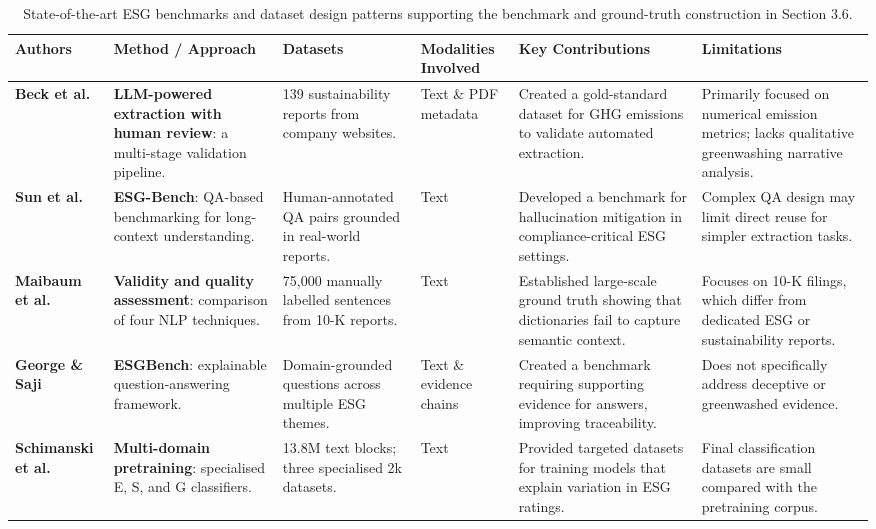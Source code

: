 \begin{landscape}
\begin{table}[p]
\centering
\caption{State-of-the-art ESG benchmarks and dataset design patterns supporting the benchmark and ground-truth construction in Section 3.6.}
\label{tab:esg-benchmark-dataset-design}
\small
\renewcommand{\arraystretch}{1.2}
\begin{tabularx}{\linewidth}{|p{1.8cm}|X|X|p{1.8cm}|X|X|}
\hline
Authors & Method / Approach & Datasets & Modalities Involved & Key Contributions & Limitations \\ \hline
\textbf{Beck et al.} \parencite{jacob_beck_9548a833} & \textbf{LLM-powered extraction with human review}: a multi-stage validation pipeline. & 139 sustainability reports from company websites. & Text \& PDF metadata & Created a gold-standard dataset for GHG emissions to validate automated extraction. & Primarily focused on numerical emission metrics; lacks qualitative greenwashing narrative analysis. \\ \hline
\textbf{Sun et al.} \parencite{siqi_sun_f6a51152} & \textbf{ESG-Bench}: QA-based benchmarking for long-context understanding. & Human-annotated QA pairs grounded in real-world reports. & Text & Developed a benchmark for hallucination mitigation in compliance-critical ESG settings. & Complex QA design may limit direct reuse for simpler extraction tasks. \\ \hline
\textbf{Maibaum et al.} \parencite{frederik_maibaum_b8629037} & \textbf{Validity and quality assessment}: comparison of four NLP techniques. & 75,000 manually labelled sentences from 10-K reports. & Text & Established large-scale ground truth showing that dictionaries fail to capture semantic context. & Focuses on 10-K filings, which differ from dedicated ESG or sustainability reports. \\ \hline
\textbf{George \& Saji} \parencite{s_s__george_b30d4b3e} & \textbf{ESGBench}: explainable question-answering framework. & Domain-grounded questions across multiple ESG themes. & Text \& evidence chains & Created a benchmark requiring supporting evidence for answers, improving traceability. & Does not specifically address deceptive or greenwashed evidence. \\ \hline
\textbf{Schimanski et al.} \parencite{tobias_schimanski_4e192ec5} & \textbf{Multi-domain pretraining}: specialised E, S, and G classifiers. & 13.8M text blocks; three specialised 2k datasets. & Text & Provided targeted datasets for training models that explain variation in ESG ratings. & Final classification datasets are small compared with the pretraining corpus. \\ \hline

\end{tabularx}
\end{table}
\end{landscape}
